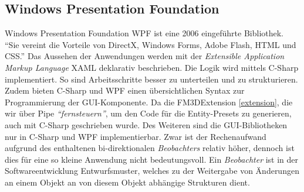 \subsection{Windows Presentation Foundation}
\label{wpf}

Windows Presentation Foundation \ac{WPF} ist eine 2006 eingeführte Bibliothek. \cite{wikipedia_wpf} "`Sie vereint die Vorteile von DirectX, Windows Forms, Adobe Flash, HTML und CSS."'\cite{eiwpf} 
Das Aussehen der Anwendungen werden mit der \textit{Extensible Application Markup Language} \ac{XAML} deklarativ beschrieben. Die Logik wird mittels C-Sharp implementiert. So sind Arbeitsschritte besser zu unterteilen und zu strukturieren. Zudem bieten C-Sharp und WPF einen übersichtlichen Syntax zur Programmierung der GUI-Komponente. 
Da die FM3DExtension \ref{extension}, die wir über Pipe \textit{"`fernsteuern"'}, um den Code für die Entity-Presets %
zu generieren, auch mit C-Sharp geschrieben wurde.
Des Weiteren sind die GUI-Bibliotheken nur in C-Sharp und WPF implementierbar. Zwar ist der Rechenaufwand aufgrund des enthaltenen bi-direktionalen \textit{Beobachters} relativ höher, dennoch ist dies für eine so kleine Anwendung nicht bedeutungsvoll. Ein \textit{Beobachter} ist in der Softwareentwicklung Entwurfsmuster, welches zu der Weitergabe von Änderungen an einem Objekt an von diesem Objekt abhängige Strukturen dient.